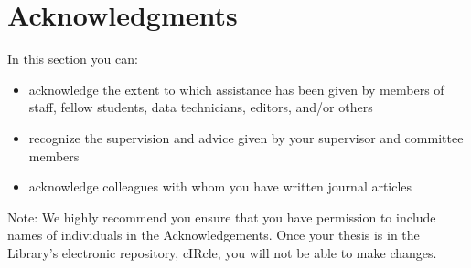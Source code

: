 
\chapter{Acknowledgments}

In this section you can:

\begin{itemize}
  \item acknowledge the extent to which assistance has been given by members of staff, fellow students, data technicians, editors, and/or others
  \item recognize the supervision and advice given by your supervisor and committee members
  \item acknowledge colleagues with whom you have written journal articles
\end{itemize}

Note: We highly recommend you ensure that you have permission to include names of individuals in the Acknowledgements. Once your thesis is in the Library's electronic repository, cIRcle, you will not be able to make changes.
